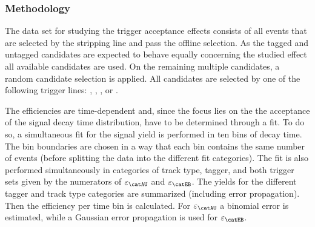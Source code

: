 \subsubsection*{Methodology}

The data set for studying the trigger acceptance effects consists of all events
that are selected by the \StrippingDetached stripping line and pass the
offline selection. As the tagged and untagged candidates are expected to behave
equally concerning the studied effect all available candidates are used.
On the remaining multiple candidates, a random candidate selection is applied.
All candidates are selected by one of the following trigger lines:
\HLTOneDiMuonHighMass, \HLTOneTrackMuon, \HLTTwoDiMuonJpsi, or
\HLTTwoDiMuonDetachedJpsi.

The efficiencies are time-dependent and, since the focus lies on the the
acceptance of the signal decay time distribution, have to be determined through
a fit. To do so, a simultaneous fit for the signal yield is performed in ten
bins of decay time. The bin boundaries are chosen in a way that each bin
contains the same number of events (before splitting the data into the different
fit categories). The fit is also performed simultaneously in categories of track
type, tagger, and both trigger sets given by the numerators of
$\varepsilon_\text{\catAU}$ and $\varepsilon_\text{\catEB}$. The yields for the
different tagger and track type categories are summarized (including error
propagation). Then the efficiency per time bin is calculated. For
$\varepsilon_{\catAU}$ a binomial error is estimated, while a Gaussian error
propagation is used for $\varepsilon_{\catEB}$.

